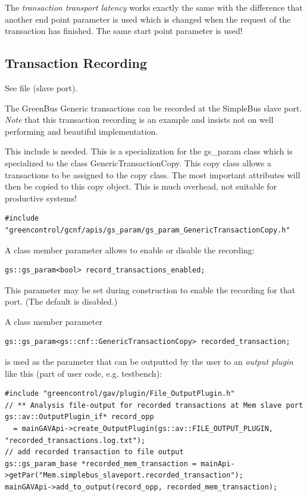 The {\em transaction transport latency} works exactly the same with the difference that another end point parameter is used which is changed when the request of the transaction has finished. The same start point parameter is used!


\subsection{Transaction Recording}

See file  (slave port).

The GreenBus Generic transactions can be recorded at the SimpleBus slave port.
{\em Note} that this transaction recording is an example and insists not on well performing 
	and beautiful implementation.
	
This include is needed. This is a specialization for the gs\_param class which is specialized to the class GenericTransactionCopy. This copy class allows a transactions to be assigned to the copy class. The most important attributes will then be copied to this copy object. This is much overhead, not suitable for productive systems!
\begin{lstlisting}
#include "greencontrol/gcnf/apis/gs_param/gs_param_GenericTransactionCopy.h"
\end{lstlisting}

A class member parameter allows to enable or disable the recording:
\begin{lstlisting}
gs::gs_param<bool> record_transactions_enabled;
\end{lstlisting}
This parameter may be set during construction to enable the recording for that port. (The default is disabled.)

A class member parameter
\begin{lstlisting}
gs::gs_param<gs::cnf::GenericTransactionCopy> recorded_transaction;
\end{lstlisting}
is used as the parameter that can be outputted by the user to an {\em output plugin} like this (part of user code, e.g. testbench):
\begin{lstlisting}
#include "greencontrol/gav/plugin/File_OutputPlugin.h"
// ** Analysis file-output for recorded transactions at Mem slave port
gs::av::OutputPlugin_if* record_opp 
  = mainGAVApi->create_OutputPlugin(gs::av::FILE_OUTPUT_PLUGIN, "recorded_transactions.log.txt");
// add recorded transaction to file output
gs::gs_param_base *recorded_mem_transaction = mainApi->getPar("Mem.simplebus_slaveport.recorded_transaction");
mainGAVApi->add_to_output(record_opp, recorded_mem_transaction);
\end{lstlisting}

